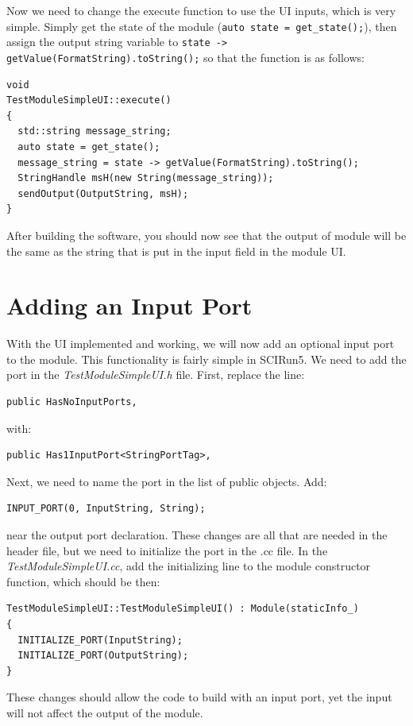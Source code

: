 \documentclass[fleqn,11pt,openany]{book}
\begin{document}
Now we need to change the execute function to use the UI inputs, which is very simple.  
Simply get the state of the module (\verb|auto state = get_state();|), then assign the output string variable to \verb|state -> getValue(FormatString).toString();| so that the function is as follows:
\begin{verbatim}
void
TestModuleSimpleUI::execute()
{
  std::string message_string;
  auto state = get_state();
  message_string = state -> getValue(FormatString).toString();
  StringHandle msH(new String(message_string));
  sendOutput(OutputString, msH);
}
\end{verbatim}
After building the software, you should now see that the output of module will be the same as the string that is put in the input field in the module UI.  

\section{Adding an Input Port}
\label{sec:addinput}

With the UI implemented and working, we will now add an optional input port to the module.  
This functionality is fairly simple in SCIRun5.  
We need to add the port in the \emph{TestModuleSimpleUI.h} file.  
First, replace the line:
\begin{verbatim}
public HasNoInputPorts,
\end{verbatim}
with:
\begin{verbatim}
public Has1InputPort<StringPortTag>,
\end{verbatim}
Next, we need to name the port in the list of public objects.  
Add:
\begin{verbatim}
INPUT_PORT(0, InputString, String);
\end{verbatim}
near the output port declaration.  
These changes are all that are needed in the header file, but we need to initialize the port in the .cc file.
In the \emph{TestModuleSimpleUI.cc}, add the initializing line to the module constructor function, which should be then:
\begin{verbatim}
TestModuleSimpleUI::TestModuleSimpleUI() : Module(staticInfo_)
{
  INITIALIZE_PORT(InputString);
  INITIALIZE_PORT(OutputString);
}
\end{verbatim}
These changes should allow the code to build with an input port, yet the input will not affect the output of the module. 
\end{document}

